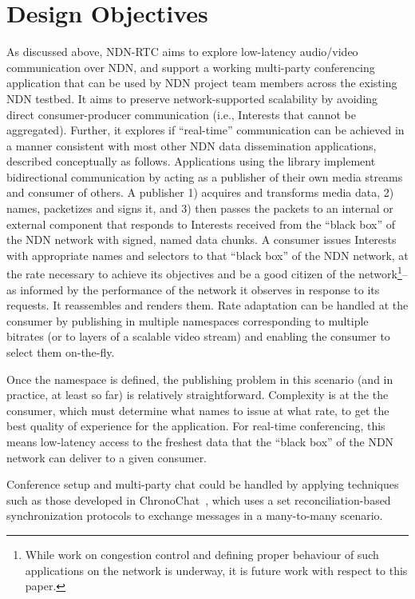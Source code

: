 \documentclass{icn/sig-alternate-2013} %
\newcommand{\ndnrtcName}{NDN-RTC} %
\begin{document}
\section{Design Objectives}
\label{sec:goals}
As discussed above, \ndnrtcName{} aims to explore low-latency audio/video communication over NDN, and support a working multi-party conferencing application that can be used by NDN project team members across the existing NDN testbed. It aims to preserve network-supported scalability by avoiding direct consumer-producer communication (i.e., Interests that cannot be aggregated).   Further, it explores if ``real-time'' communication can be achieved in a manner consistent with most other NDN data dissemination applications, described conceptually as follows. 
    Applications using the library implement bidirectional communication by acting as a publisher of their own media streams and consumer of others. A publisher 1) acquires and transforms media data, 2) names, packetizes and signs it, and 3) then passes the packets to an internal or external component that responds to Interests received from the ``black box'' of the NDN network with signed, named data chunks. A consumer issues Interests with appropriate names and selectors to that ``black box'' of the NDN network, at the rate necessary to achieve its objectives and be a good citizen of the network\footnote{While work on congestion control and defining proper behaviour of such applications on the network is underway, it is future work with respect to this paper.}--as informed by the performance of the network it observes in response to its requests. It reassembles and renders them.  Rate adaptation can be handled at the consumer by publishing in multiple namespaces corresponding to multiple bitrates (or to layers of a scalable video stream) and enabling the consumer to select them on-the-fly.

Once the namespace is defined, the publishing problem in this scenario (and in practice, at least so far) is relatively straightforward.  Complexity is at the the consumer, which must determine what names to issue at what rate, to get the best quality of experience for the application.  For real-time conferencing, this means low-latency access to the freshest data that the ``black box'' of the NDN network can deliver to a given consumer.  

Conference setup and multi-party chat could be handled by applying techniques such as those developed in ChronoChat~\cite{chronochat}, which uses a set reconciliation-based synchronization protocols to exchange messages in a many-to-many scenario. 
\end{document}
